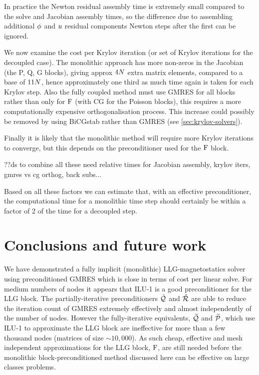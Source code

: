 In practice the Newton residual assembly time is extremely small compared to the solve and Jacobian assembly times, so the difference due to assembling additional $\phi$ and $u$ residual components Newton steps after the first can be ignored.

We now examine the cost per Krylov iteration (or set of Krylov iterations for the decoupled case).
The monolithic approach has more non-zeros in the Jacobian (the P, Q, G blocks), giving approx $4 N$ extra matrix elements, compared to a base of $11 N$, hence approximately one third as much time again is taken for each Krylov step.
Also the fully coupled method must use GMRES for all blocks rather than only for $\mathrm{F}$ (with CG for the Poisson blocks), this requires a more computationally expensive orthogonalisation process.
This increase could possibly be removed by using BiCGstab rather than GMRES (see \cref{sec:krylov-solvers}).

Finally it is likely that the monolithic method will require more Krylov iterations to converge, but this depends on the preconditioner used for the $\mathrm{F}$ block.

??ds to combine all these need relative times for Jacobian assembly, krylov iters, gmres vs cg orthog, back subs...

Based on all these factors we can estimate that, with an effective preconditioner, the computational time for a monolithic time step should certainly be within a factor of 2 of the time for a decoupled step.


\section{Conclusions and future work}

We have demonstrated a fully implicit (monolithic) LLG-magnetostatics solver using preconditioned GMRES which is close in terms of cost per linear solve.
For medium numbers of nodes it appears that ILU-1 is a good preconditioner for the LLG block.
The partially-iterative preconditioners $\hat{\mathcal{Q}}$ and $\hat{\mathcal{R}}$ are able to reduce the iteration count of GMRES extremely effectively and almost independently of the number of nodes.
However the fully-iterative equivalents, $\widetilde{\mathcal{Q}}$ and  $\widetilde{\mathcal{P}}$, which use ILU-1 to approximate the LLG block are ineffective for more than a few thousand nodes (\ie matrices of size $\sim 10,000$).
As such cheap, effective and mesh independent approximations for the LLG block, $\mathrm{F}$, are still needed before the monolithic block-preconditioned method discussed here can be effective on large classes problems.

